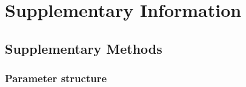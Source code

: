 \appendix
\setcounter{equation}{0}
\setcounter{figure}{0}
\setcounter{table}{0}
\renewcommand{\theequation}{S\arabic{equation}}
\renewcommand{\thefigure}{S\arabic{figure}}
\renewcommand{\thetable}{S\arabic{table}}

\section*{Supplementary Information}

\subsection*{Supplementary Methods}

\subsubsection*{Parameter structure}

